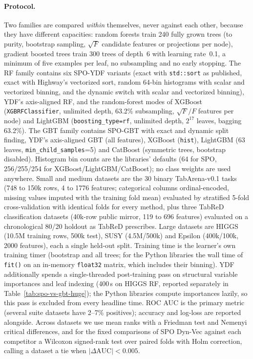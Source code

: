 \paragraph{Protocol.}
Two families are compared \emph{within} themselves, never against each other, because they
have different capacities: random forests train 240 fully grown trees (to purity, bootstrap
sampling, $\sqrt{F}$ candidate features or projections per node), gradient boosted trees train
300 trees of depth~6 with learning rate~0.1, a minimum of five examples per leaf, no
subsampling and no early stopping. The RF family contains six SPO-YDF variants (exact with
\texttt{std::sort} as published, exact with Highway's vectorized sort, random 64-bin histograms
with scalar and vectorized binning, and the dynamic switch with scalar and vectorized binning),
YDF's axis-aligned RF, and the random-forest modes of XGBoost (\texttt{XGBRFClassifier},
unlimited depth, 63.2\% subsampling, $\sqrt{F}/F$ features per node) and LightGBM
(\texttt{boosting\_type=rf}, unlimited depth, $2^{17}$ leaves, bagging 63.2\%). The GBT family
contains SPO-GBT with exact and dynamic split finding, YDF's axis-aligned GBT (all features),
XGBoost (\texttt{hist}), LightGBM (63 leaves, \texttt{min\_child\_samples}=5) and CatBoost
(symmetric trees, bootstrap disabled). Histogram bin counts are the libraries' defaults (64 for
SPO, 256/255/254 for XGBoost/LightGBM/CatBoost); no class weights are used anywhere. Small
and medium datasets are the 30 binary TabArena-v0.1 tasks~\cite{tabarena} (748 to 150k rows, 4 to
1776 features; categorical columns ordinal-encoded, missing values imputed with the training
fold mean) evaluated by stratified 5-fold cross-validation with identical folds for every
method, plus three TabReD~\cite{tabred} classification datasets (40k-row public mirror, 119 to 696
features) evaluated on a chronological 80/20 holdout as TabReD prescribes. Large datasets are
HIGGS (10.5M training rows, 500k test), SUSY (4.5M/500k) and Epsilon (400k/100k, 2000 features),
each a single held-out split. Training time is the learner's own training timer (bootstrap and
all trees; for the Python libraries the wall time of \texttt{fit()} on an in-memory
\texttt{float32} matrix, which includes their binning). YDF additionally spends a
single-threaded post-training pass on structural variable importances and leaf indexing
(400\,s on HIGGS RF, reported separately in Table~\ref{tab:spo-vs-gbt-huge}); the Python
libraries compute importances lazily, so this pass is excluded from every headline time. ROC
AUC is the primary metric (several suite datasets have 2--7\% positives); accuracy and
log-loss are reported alongside. Across datasets we use mean ranks with a Friedman test and
Nemenyi critical differences, and for the fixed comparisons of SPO Dyn-Vec against each
competitor a Wilcoxon signed-rank test over paired folds with Holm correction, calling a
dataset a tie when $|\Delta\mathrm{AUC}|<0.005$.



